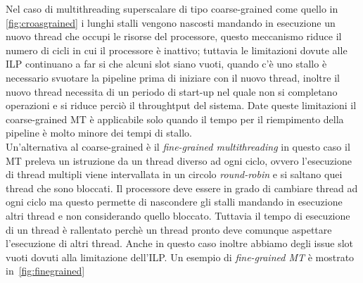 Nel caso di multithreading superscalare di tipo coarse-grained come quello in \figurename	\,\ref{fig:croasgrained} i lunghi stalli vengono nascosti mandando in esecuzione un nuovo thread che occupi le risorse del processore, questo meccanismo riduce il numero di cicli in cui il processore è inattivo; tuttavia le limitazioni dovute alle ILP continuano a far si che alcuni slot siano vuoti, quando c'è uno stallo è necessario svuotare la pipeline prima di iniziare con il nuovo thread, inoltre il nuovo thread necessita di un periodo di start-up nel quale non si completano operazioni e si riduce perciò il throughtput del sistema. Date queste limitazioni il coarse-grained MT è applicabile solo quando il tempo per il riempimento della pipeline è molto minore dei tempi di stallo.\\
Un'alternativa al coarse-grained è il \emph{fine-grained multithreading} in questo caso il MT preleva un istruzione da un thread diverso ad ogni ciclo, ovvero l'esecuzione di thread multipli viene intervallata in un circolo \emph{round-robin} e si saltano quei thread che sono bloccati. Il processore deve essere in grado di cambiare thread ad ogni ciclo ma questo permette di nascondere gli stalli mandando in esecuzione altri thread e non considerando quello bloccato. Tuttavia il tempo di esecuzione di un thread è rallentato perchè un thread pronto deve comunque aspettare l'esecuzione di altri thread. Anche in questo caso inoltre abbiamo degli issue slot vuoti dovuti alla limitazione dell'ILP. Un esempio di \emph{fine-grained MT} è mostrato in \figurename\,\ref{fig:finegrained}

